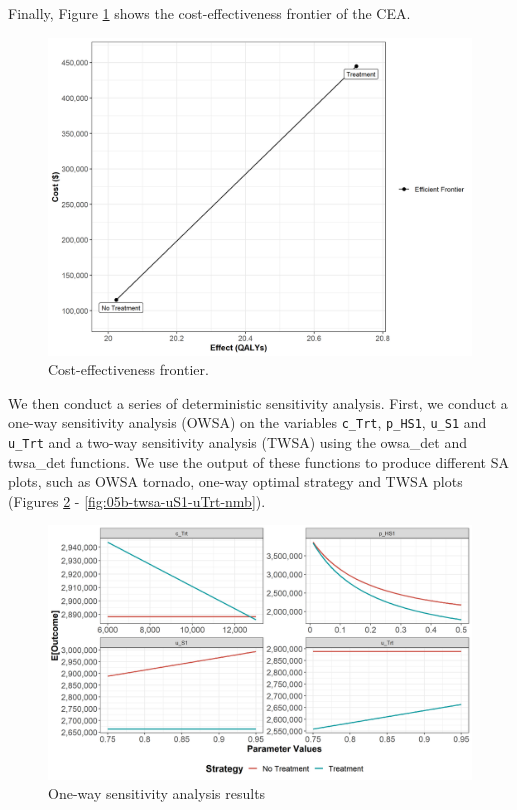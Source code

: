 \documentclass[]{book}
\begin{document}
Finally, Figure \ref{fig:05b-CEA-frontier} shows the cost-effectiveness
frontier of the CEA.

\begin{figure}

{\centering \includegraphics[width=1\linewidth]{../figs/05b_cea_frontier} 

}

\caption{Cost-effectiveness frontier.}\label{fig:05b-CEA-frontier}
\end{figure}

We then conduct a series of deterministic sensitivity analysis. First,
we conduct a one-way sensitivity analysis (OWSA) on the variables
\texttt{c\_Trt}, \texttt{p\_HS1}, \texttt{u\_S1} and \texttt{u\_Trt} and
a two-way sensitivity analysis (TWSA) using the owsa\_det and twsa\_det
functions. We use the output of these functions to produce different SA
plots, such as OWSA tornado, one-way optimal strategy and TWSA plots
(Figures \ref{fig:05b-owsa-nmb} - \ref{fig:05b-twsa-uS1-uTrt-nmb}).

\begin{figure}

{\centering \includegraphics[width=1\linewidth]{../figs/05b_owsa_nmb} 

}

\caption{One-way sensitivity analysis results}\label{fig:05b-owsa-nmb}
\end{figure}
\end{document}
